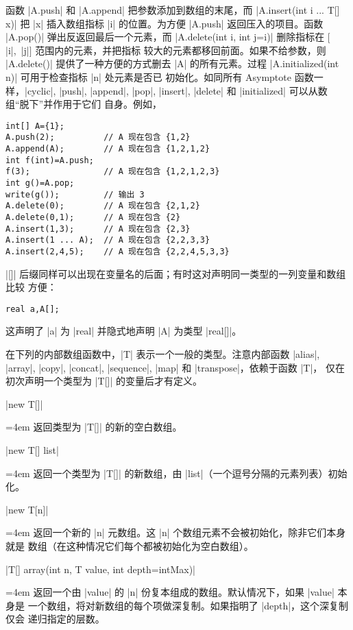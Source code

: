 \documentclass[nofonts,CJKnormalspaces]{ctexbook}[2009/05/20]
\newenvironment{funclist}{\trivlist
  \parindent=0pt
\item[]
  \def\item{\medskip\par\leftskip=0pt}
  \def\go{\par\leftskip=4em}}
{\endtrivlist}
\newcommand*\prgname[1]{\textsf{#1}}
\begin{document}
{{{函数 |A.push| 和 |A.append| 把参数添加到数组的末尾，而
|A.insert(int i ... T[] x)| 把 |x| 插入数组指标 |i| 的位置。为方便 |A.push|
返回压入的项目。函数 |A.pop()| 弹出反返回最后一个元素，而
|A.delete(int i, int j=i)| 删除指标在 $[$|i|,~|j|$]$ 范围内的元素，并把指标
较大的元素都移回前面。如果不给参数，则 |A.delete()| 提供了一种方便的方式删去
|A| 的所有元素。过程 |A.initialized(int n)| 可用于检查指标 |n| 处元素是否已
初始化。如同所有 \prgname{Asymptote} 函数一样，|cyclic|, |push|, |append|,
|pop|, |insert|, |delete| 和 |initialized| 可以从数组“脱下”并作用于它们
自身。例如，
\begin{lstlisting}
int[] A={1};
A.push(2);          // A 现在包含 {1,2}
A.append(A);        // A 现在包含 {1,2,1,2}
int f(int)=A.push;
f(3);               // A 现在包含 {1,2,1,2,3}
int g()=A.pop;
write(g());         // 输出 3
A.delete(0);        // A 现在包含 {2,1,2}
A.delete(0,1);      // A 现在包含 {2}
A.insert(1,3);      // A 现在包含 {2,3}
A.insert(1 ... A);  // A 现在包含 {2,2,3,3}
A.insert(2,4,5);    // A 现在包含 {2,2,4,5,3,3}
\end{lstlisting}

|[]| 后缀同样可以出现在变量名的后面；有时这对声明同一类型的一列变量和数组比较
方便：
\begin{lstlisting}
real a,A[];
\end{lstlisting}
这声明了 |a| 为 |real| 并隐式地声明 |A| 为类型 |real[]|。

在下列的内部数组函数中，|T| 表示一个一般的类型。注意内部函数 |alias|,
|array|, |copy|, |concat|, |sequence|, |map| 和 |transpose|，依赖于函数 |T|，
仅在初次声明一个类型为 |T[]| 的变量后才有定义。

\begin{funclist}
\item |new T[]| \go
  返回类型为 |T[]| 的新的空白数组。

\item |new T[] {list}| \go
  返回一个类型为 |T[]| 的新数组，由 |list|（一个逗号分隔的元素列表）初始化。

\item |new T[n]| \go
  返回一个新的 |n| 元数组。这 |n| 个数组元素不会被初始化，除非它们本身就是
  数组（在这种情况它们每个都被初始化为空白数组）。

\item |T[] array(int n, T value, int depth=intMax)| \go
  返回一个由 |value| 的 |n| 份复本组成的数组。默认情况下，如果 |value| 本身是
  一个数组，将对新数组的每个项做深复制。如果指明了 |depth|，这个深复制仅会
  递归指定的层数。


\end{funclist}}}}
\end{document}
